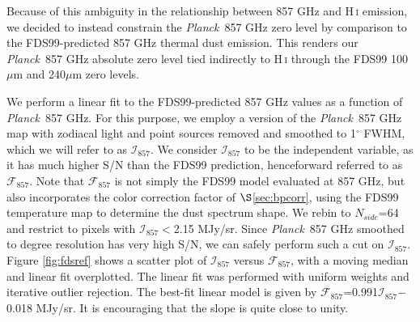 \documentclass{emulateapj}
\newcommand{\PLANCK}{{\it Planck}}
\begin{document}
\begin{figure*}
\begin{center}
\caption{\label{fig:harm} Summary of low-order corrections at 100 GHz. Left: 
prior to our low-order corrections, a $\sim$17$\mu$K zero level offset is 
present and strong low-order problems reduce the linearity of the 100 GHz 
trend versus 857 GHz. Center: scatter plot of \PLANCK~100 GHz versus 857 GHz 
after applying the best-fit offset and residual Solar dipole corrections 
derived with Equation \ref{equ:dip} to \PLANCK~100 GHz. The correlation is 
strengthened, but remains far less tight than for 143-545 GHz (see right 
column of Figure \ref{fig:dip}, top four rows). Right: after applying the 
spherical harmonic corrections of Equation \ref{equ:harm} to \PLANCK~100 GHz, 
the correlation versus 857 GHz is far more tightly linear than following the 
dipole correction.}
\end{center}
\end{figure*}

Because of this ambiguity in the relationship between 857 GHz and H\,\textsc{i}
emission, we decided to instead constrain the \PLANCK~857 GHz zero level by 
comparison to the FDS99-predicted 857 GHz thermal dust emission. This renders 
our \PLANCK~857 GHz absolute zero level tied indirectly to H\,\textsc{i} 
through the FDS99 100$\mu$m and 240$\mu$m zero levels.

We perform a linear fit to the FDS99-predicted 857 GHz values as 
a function of \PLANCK~857 GHz. For this purpose, we employ a version of the 
\PLANCK~857 GHz map with zodiacal light and point sources removed and smoothed 
to 1$^{\circ}$ FWHM, which we will refer to as $\mathcal{I}_{857}$. We 
consider $\mathcal{I}_{857}$ to be the independent variable, as it has much 
higher S/N than the FDS99 prediction, henceforward referred to as 
$\mathcal{F}_{857}$. Note that $\mathcal{F}_{857}$ is not simply the FDS99
model evaluated at 857 GHz, but also incorporates the color correction factor 
of $\S$\ref{sec:bpcorr}, using the FDS99 temperature map to determine the dust 
spectrum shape. We rebin to $N_{side}$=64 and restrict to pixels with 
$\mathcal{I}_{857}$$<$2.15 MJy/sr. Since \PLANCK~857 GHz smoothed to degree 
resolution has very high S/N, we can safely perform such a cut on 
$\mathcal{I}_{857}$. Figure \ref{fig:fdsref} shows a scatter plot of 
$\mathcal{I}_{857}$ versus $\mathcal{F}_{857}$, with a moving median and linear
fit overplotted. The linear fit was performed with uniform weights and 
iterative outlier rejection. The best-fit linear model is given by 
$\mathcal{F}_{857}$=0.991$\mathcal{I}_{857}$$-$0.018 MJy/sr. It is encouraging 
that the slope is quite close to unity.
\end{document}
